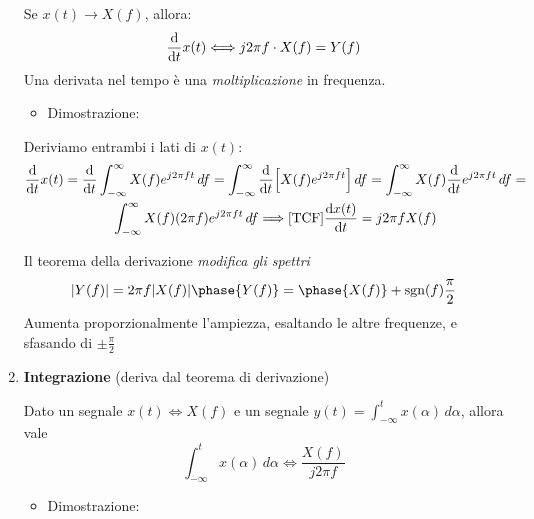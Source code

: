\documentclass[
  paper=a4,
  ,captions=tableheading
]{scrartcl}
\providecommand{\tightlist}{%
  \setlength{\itemsep}{0pt}\setlength{\parskip}{0pt}}
\begin{document}
\begin{enumerate}
  Se \(x(t) \to X(f)\), allora: \[
  \odv{}{t} x(t) \Longleftrightarrow j2\pi f \cdot X(f) = Y(f)
  \] Una derivata nel tempo è una \emph{moltiplicazione} in frequenza.

  \begin{itemize}
  \tightlist
  \item
    Dimostrazione:
  \end{itemize}

  Deriviamo entrambi i lati di \(x(t)\): \begin{gather*}
  \odv{}{t}x(t) = \odv{}{t} \int_{-\infty}^{\infty} X(f) e^{j2\pi ft} \,df = \int_{-\infty}^{\infty}\odv{}{t} \Big [X(f) e^{j2\pi ft} \Big ] \,df = \int_{-\infty}^{\infty} X(f) \odv{}{t}e^{j2\pi ft} \,df = 
  \\
  \int_{-\infty}^{\infty} X(f) (2\pi f) e^{j2\pi ft} \,df \Longrightarrow \text{[TCF]}\odv{x(t)}{t} = j2\pi f X(f)
  \end{gather*}

  Il teorema della derivazione \emph{modifica gli spettri} \[
  |Y(f)| = 2\pi f |X(f)| \\ \phase{Y(f)} = \phase{X(f)} + \text{sgn}(f)\frac{\pi}{2}
  \] Aumenta proporzionalmente l'ampiezza, esaltando le altre frequenze,
  e sfasando di \(\pm \frac{\pi}{2}\) \newpage
\item
  \textbf{Integrazione} (deriva dal teorema di derivazione)

  Dato un segnale \(x(t) \Longleftrightarrow X(f)\) e un segnale
  \(y(t) = \int_{-\infty}^{t} x(\alpha) \,d\alpha\), allora vale \[
  \int_{-\infty}^{t}  x(\alpha) \,d\alpha \Longleftrightarrow \frac{X(f)}{j2\pi f}
  \]

  \begin{itemize}
  \tightlist
  \item
    Dimostrazione:
  \end{itemize}


\end{enumerate}
\end{document}
